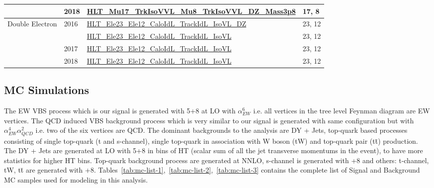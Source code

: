 \begin{table}[!ht]
{\begin{tabular}{clll}
      \cmidrule(lr){2-4}
              & \multirow{1}{*}{2018} & \url{HLT_Mu17_TrkIsoVVL_Mu8_TrkIsoVVL_DZ_Mass3p8} & 17, 8  \GeV{}       \\
      \midrule
      \multirow{4}{*}{Double Electron}
              & \multirow{2}{*}{2016} & \url{HLT_Ele23_Ele12_CaloIdL_TrackIdL_IsoVL_DZ}   & 23, 12 \GeV{}       \\
              &                       & \url{HLT_Ele23_Ele12_CaloIdL_TrackIdL_IsoVL}      & 23, 12 \GeV{}       \\
      \cmidrule(lr){2-4}
              & \multirow{1}{*}{2017} & \url{HLT_Ele23_Ele12_CaloIdL_TrackIdL_IsoVL}      & 23, 12 \GeV{}       \\
      \cmidrule(lr){2-4}
              & \multirow{1}{*}{2018} & \url{HLT_Ele23_Ele12_CaloIdL_TrackIdL_IsoVL}      & 23, 12 \GeV{}       \\
      \bottomrule
    \end{tabular}}\label{tab:hlt-paths}
\end{table}

\subsection{
  MC Simulations
}

The \gls{EW} \gls{VBS} process which is our signal is
generated with \MADGRAPH{}5+\PYTHIA{}8 at \gls{LO} with \( \alpha_{EW}^{6} \)
i.e.
all vertices in the tree level Feynman diagram are \gls{EW} vertices.
The \gls{QCD} induced \gls{VBS} background process which is very
similar to our signal is generated with same configuration
but with \( \alpha_{EW}^{4} \alpha_{QCD}^{2} \) i.e.
two of the six vertices are \gls{QCD}. The dominant backgrounds to the analysis
are \gls{DY} + Jets, top-quark based processes consisting of
single top-quark (t and s-channel),
single top-quark in association with W boson (tW) and top-quark pair (t\=t) production.
The \gls{DY} + Jets are generated at \gls{LO} with \MADGRAPH{}5+\PYTHIA{}8
in bins of HT
(scalar sum of all the jet transverse momentums in the event), to have more statistics
for higher HT bins. Top-quark background process are generated at \gls{NNLO},
s-channel is generated with \MGvATNLO+\PYTHIA{}8 and others:
t-channel, tW, t\=t are generated with \POWHEG{}+\PYTHIA{}8.
Tables~\ref{tab:mc-list-1},~\ref{tab:mc-list-2},~\ref{tab:mc-list-3} contains
the complete list of Signal and Background MC samples used for modeling in this analysis.

